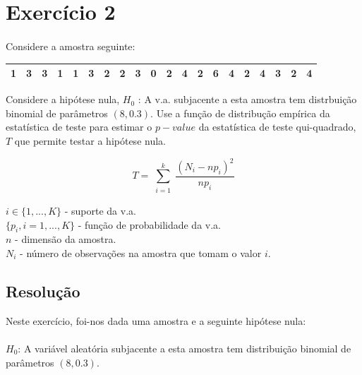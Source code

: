 \documentclass{article}
\begin{document}
	\section*{Exercício 2}
		\paragraph{}
			Considere a amostra seguinte:
			
			\begin{table}[!h]
				\begin{tabular}{|c|c|c|c|c|c|c|c|c|c|c|c|c|c|c|c|c|c|c|c|}
					\hline
 					1 & 3 & 3 & 1 & 1 & 3 & 2 & 2 & 3 & 0 & 2 & 4 & 2 & 6 & 4 & 2 & 4 & 3 & 2 & 4\\
 					\hline
				\end{tabular}
			\end{table}
			
			\noindent Considere a hipótese nula, $H_0$ : A v.a. subjacente a esta amostra tem distrbuição binomial de parâmetros $(8, 0.3)$. Use a função de distribução empírica da estatística de teste para estimar o $p-value$ da estatística de teste qui-quadrado, $T$ que permite testar a hipótese nula.
			
			\begin{equation*}
				T = \sum_{\substack{i=1}}^{k} \frac{(N_i - np_i)^2}{np_i}
			\end{equation*}
			
			
			\indent\indent\indent\indent\indent $i \in \{1,...,K\}$ - suporte da v.a.\\
			\indent\indent\indent\indent\indent$\{p_i,i=1,...,K\}$ - função de probabilidade da v.a.\\
			\indent\indent\indent\indent\indent$n$ - dimensão da amostra.\\
			\indent\indent\indent\indent\indent$N_i$ - número de observações na amostra que tomam o valor $i$.\\
			
\newpage
			
			\subsection*{Resolução}
			
				Neste exercício, foi-nos dada uma amostra e a seguinte hipótese nula:\\\\
				\indent $H_0$: A variável aleatória subjacente a esta amostra tem distribuição binomial de parâmetros $(8, 0.3)$.\\
				
\end{document}
